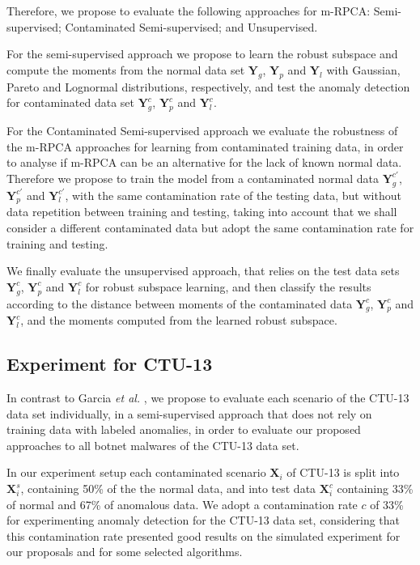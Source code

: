 Therefore, we propose to evaluate the following approaches for m-RPCA: Semi-supervised; Contaminated Semi-supervised; and Unsupervised.

For the semi-supervised approach we propose to learn the robust subspace and compute the moments from the normal data set $\pmb{Y}_g$, $\pmb{Y}_p$ and $\pmb{Y}_l$ with Gaussian, Pareto and Lognormal distributions, respectively, and test the anomaly detection for contaminated data set $\pmb{Y}_g^c$, $\pmb{Y}_p^c$ and $\pmb{Y}_l^c$.

For the Contaminated Semi-supervised approach we evaluate the robustness of the m-RPCA approaches for learning from contaminated training data, in order to analyse if m-RPCA can be an alternative for the lack of known normal data. Therefore we propose to train the model from a contaminated normal data $\pmb{Y}_g^{c'}$, $\pmb{Y}_p^{c'}$ and $\pmb{Y}_l^{c'}$, with the same contamination rate of the testing data, but without data repetition between training and testing, taking into account that we shall consider a different contaminated data but adopt the same contamination rate for training and testing.

We finally evaluate the unsupervised approach, that relies on the test data sets $\pmb{Y}_g^c$, $\pmb{Y}_p^c$ and $\pmb{Y}_l^c$ for robust subspace learning, and then classify the results according to the distance between moments of the contaminated data $\pmb{Y}_g^c$, $\pmb{Y}_p^c$ and $\pmb{Y}_l^c$, and the moments computed from the learned robust subspace.

\subsection{Experiment for CTU-13}
\label{sec:4_CTU13Scenario}

In contrast to Garcia \emph{et al.} \cite{garcia2014empirical}, we propose to evaluate each scenario of the CTU-13 data set individually, in a semi-supervised approach that does not rely on training data with labeled anomalies, in order to evaluate our proposed approaches to all botnet malwares of the CTU-13 data set. 

In our experiment setup each contaminated scenario $\pmb{X}_i$ of CTU-13 is split into $\pmb{X}_i^s$, containing 50\% of the the normal data, and into test data $\pmb{X}_i^c$ containing 33\% of normal and 67\% of anomalous data. We adopt a contamination rate $c$ of 33\% for  experimenting anomaly detection for the CTU-13 data set, considering that this contamination rate presented good results on the simulated experiment for our proposals and for some selected algorithms.

